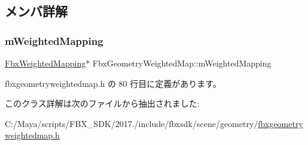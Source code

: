 \subsection{メンバ詳解}
\mbox{\label{class_fbx_geometry_weighted_map_a2d36d5ffef5895fb3faa75378884b32d}} 
\subsubsection{\texorpdfstring{m\+Weighted\+Mapping}{mWeightedMapping}}
{\footnotesize\ttfamily \hyperlink{class_fbx_weighted_mapping}{Fbx\+Weighted\+Mapping}$\ast$ Fbx\+Geometry\+Weighted\+Map\+::m\+Weighted\+Mapping\hspace{0.3cm}{\ttfamily [protected]}}



 fbxgeometryweightedmap.\+h の 80 行目に定義があります。



このクラス詳解は次のファイルから抽出されました\+:\begin{DoxyCompactItemize}
\item 
C\+:/\+Maya/scripts/\+F\+B\+X\+\_\+\+S\+D\+K/2017./include/fbxsdk/scene/geometry/\hyperlink{fbxgeometryweightedmap_8h}{fbxgeometryweightedmap.\+h}\end{DoxyCompactItemize}

